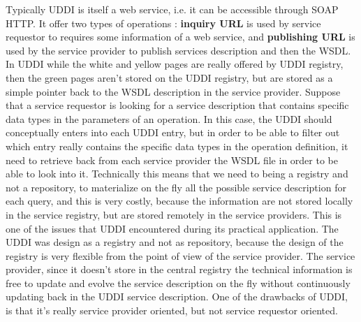 \documentclass[11pt]{article}
\begin{document}
Typically UDDI is itself a web service, i.e. it can be accessible through SOAP HTTP. It offer two types of operations : \textbf{inquiry URL} is used by service requestor to requires some information of a web service, and \textbf{publishing URL} is used by the service provider to publish services description and then the WSDL. In UDDI while the white and yellow pages are really offered by UDDI registry, then the green pages aren't stored on the UDDI registry, but are stored as a simple pointer back to the WSDL description in the service provider. Suppose that a service requestor is looking for a service description that contains specific data types in the parameters of an operation. In this case, the UDDI should conceptually enters into each UDDI entry, but in order to be able to filter out which entry really contains the specific data types in the operation definition, it need to retrieve back from each service provider the WSDL file in order to be able to look into it. Technically this means that we need to being a registry and not a repository, to materialize on the fly all the possible service description for each query, and this is very costly, because the information are not stored locally in the service registry, but are stored remotely in the service providers. This is one of the issues that UDDI encountered during its practical application. The UDDI was design as a registry and not as repository, because the design of the registry is very flexible from the point of view of the service provider. The service provider, since it doesn't store in the central registry the technical information is free to update and evolve the service description on the fly without continuously updating back in the UDDI service description. One of the drawbacks of UDDI, is that it's really service provider oriented, but not service requestor oriented.
\end{document}
